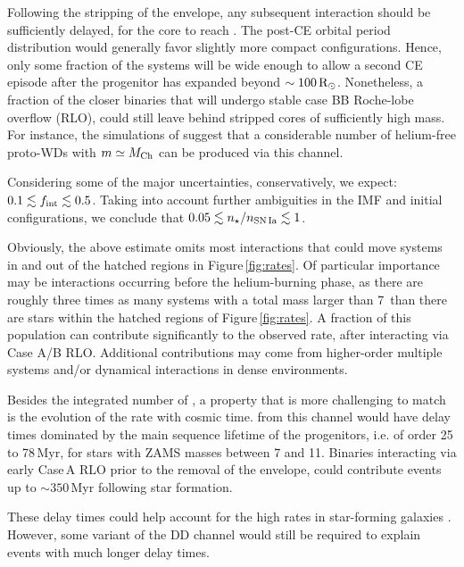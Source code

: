 \documentclass[../../main/thesis_msc.tex]{subfiles}
\begin{document}
Following the stripping of the envelope, any 
subsequent interaction should be sufficiently delayed, for the core to reach \mch. The post-CE orbital period distribution would generally favor slightly more compact configurations. Hence, only some fraction of the systems will be wide enough to allow 
 a second CE episode after the progenitor has expanded beyond $\sim 100\mathrm{\,R_\odot}$. 
Nonetheless, a fraction of the closer binaries that will undergo stable case BB Roche-lobe 
overflow (RLO), could still leave behind stripped \one cores of sufficiently high mass. For instance, the
 simulations of \cite{Tauris_ultra} suggest that   a considerable number of helium-free \one proto-WDs 
with $m\simeq M_{\mathrm{Ch}}$ can be produced via this channel. 

Considering some of the major uncertainties, conservatively, we expect: $0.1 \lesssim f_{\rm int}\lesssim 0.5$. 
Taking into account further ambiguities in the IMF and initial configurations, we conclude 
that $0.05\lesssim n_\star / n_{\rm SN\,Ia} \lesssim 1$. 

Obviously, the above estimate omits most interactions that could move systems in and out of the hatched regions in 
Figure\,\ref{fig:rates}. Of particular importance may be interactions 
occurring before the helium-burning phase, as there are  
roughly three times as many systems with a total mass larger than 7\msun\  
than there are stars within the hatched regions of Figure\,\ref{fig:rates}. 
A fraction of this population can contribute significantly to the observed rate, after interacting via Case A/B RLO. 
Additional contributions may come from higher-order multiple systems and/or dynamical interactions in dense environments.  


Besides the integrated number of \ias, a property that is more challenging to match is the evolution of the \ia rate with cosmic time. \ias from this channel would have delay times dominated by the main sequence lifetime of the progenitors, i.e. of order 25 to 78\,Myr, for stars with ZAMS masses between 7 and 11\msun. Binaries interacting via early Case\,A RLO prior to the removal of the envelope, could contribute events up to $\sim 350$\,Myr following star formation. 

These delay times could help account for the high \ia rates in star-forming galaxies \citep{Maoz:2010pz,claeys2014a}. 
However, some variant of the DD channel would still be required to explain events with much longer delay times.  
\end{document}
